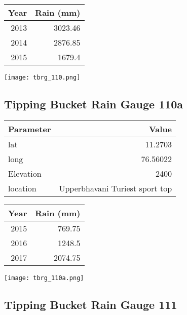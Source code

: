 \documentclass[a4paper]{article}
\begin{document}
\begin{center}
\begin{tabular}{rr}
Year & Rain (mm)\\
\hline
2013 & 3023.46\\
2014 & 2876.85\\
2015 & 1679.4\\
\end{tabular}
\end{center}

\begin{center}
\texttt{[image: tbrg\_110.png]}
\end{center}

\newpage

\subsection*{Tipping Bucket Rain Gauge 110a}
\label{sec:org995445c}

\begin{center}
\begin{tabular}{lr}
Parameter & Value\\
\hline
lat & 11.2703\\
long & 76.56022\\
Elevation & 2400\\
location & Upperbhavani Turiest sport top\\
\end{tabular}
\end{center}

\begin{center}
\begin{tabular}{rr}
Year & Rain (mm)\\
\hline
2015 & 769.75\\
2016 & 1248.5\\
2017 & 2074.75\\
\end{tabular}
\end{center}

\begin{center}
\texttt{[image: tbrg\_110a.png]}
\end{center}

\newpage

\subsection*{Tipping Bucket Rain Gauge 111}
\label{sec:orge6fd178}
\end{document}
